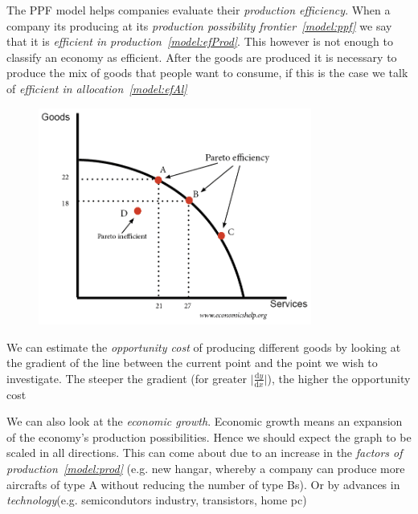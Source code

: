 \documentclass[english,course]{Notes}
\newcommand{\ita}[1]{\textit{#1}}
\begin{document}
\par{The PPF model helps companies evaluate their \ita{production efficiency}. When a company its producing at its \ita{production possibility frontier~\ref{model:ppf}} we say that it is \ita{efficient in production~\ref{model:efProd}}. This however is not enough to classify an economy as efficient. After the goods are produced it is necessary to produce the mix of goods that people want to consume, if this is the case we talk of \ita{efficient in allocation~\ref{model:efAl}}}


\begin{figure}[h]
\centering
\includegraphics[width=0.8\textwidth]{assets/ppf.png}
\end{figure}

\par{We can estimate the \ita{opportunity cost} of producing different goods by looking at the gradient of the line between the current point and the point we wish to investigate. The steeper the gradient (for greater $\Big|\frac{\mathrm{d}y}{\mathrm{d}x}\Big| $), the higher the opportunity cost}

\par{We can also look at the \ita{economic growth}. Economic growth means an expansion of the economy's production possibilities. Hence we should expect the graph to be scaled in all directions. This can come about due to an increase in the \ita{factors of production~\ref{model:prod}} (e.g. new hangar, whereby a company can produce more aircrafts of type A without reducing the number of type Bs). Or by advances in \ita{technology}(e.g. semicondutors industry, transistors, home pc)}









\newpage
\nocite{*}
\printbibliography
\end{document}
